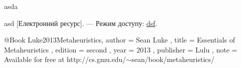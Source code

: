 \begin{thebibliography}    
    asda

    asd [Електронний ресурс]. --- Режим доступу: \url{dsf}.

@Book{ Luke2013Metaheuristics, 
       author =    { Sean Luke }, 
       title =     { Essentials of Metaheuristics },
       edition =   { second },
       year =      { 2013 }, 
       publisher = { Lulu },
       note =      { Available for free at http://cs.gmu.edu/$\sim$sean/book/metaheuristics/ } 
     }
 
\end{thebibliography}
